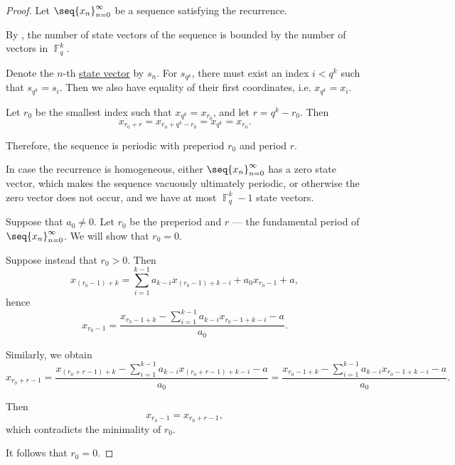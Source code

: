 \begin{proof}
  Let \( \seq{ x_n }_{n=0}^\infty \) be a sequence satisfying the recurrence.

   By , the number of state vectors of the sequence is bounded by the number of vectors in \( \BbbF_q^k \).

  Denote the \( n \)-th \hyperref[def:recurrence_relation/state]{state vector} by \( s_n \). For \( s_{q^k} \), there must exist an index \( i < q^k \) such that \( s_{q^k} = s_i \). Then we also have equality of their first coordinates, i.e. \( x_{q^k} = x_i \).

  Let \( r_0 \) be the smallest index such that \( x_{q^k} = x_{r_0} \), and let \( r = q^k - r_0 \). Then
  \begin{equation*}
    x_{r_0 + r} = x_{r_0 + q^k - r_0} = x_{q^k} = x_{r_0}.
  \end{equation*}

  Therefore, the sequence is periodic with preperiod \( r_0 \) and period \( r \).

   In case the recurrence is homogeneous, either \( \seq{ x_n }_{n=0}^\infty \) has a zero state vector, which makes the sequence vacuously ultimately periodic, or otherwise the zero vector does not occur, and we have at most \( \BbbF_q^k - 1 \) state vectors.

   Suppose that \( a_0 \neq 0 \). Let \( r_0 \) be the preperiod and \( r \) --- the fundamental period of \( \seq{ x_n }_{n=0}^\infty \). We will show that \( r_0 = 0 \).

  Suppose instead that \( r_0 > 0 \). Then
  \begin{equation*}
    x_{(r_0-1)+k} = \sum_{i=1}^{k-1} a_{k-i} x_{(r_0-1)+k-i} + a_0 x_{r_0-1} + a,
  \end{equation*}
  hence
  \begin{equation*}
    x_{r_0-1}
    =
    \frac {x_{r_0-1+k} - \sum_{i=1}^{k-1} a_{k-i} x_{r_0-1+k-i} - a} {a_0}.
  \end{equation*}

  Similarly, we obtain
  \begin{equation*}
    x_{r_0+r-1}
    =
    \frac {x_{(r_0+r-1)+k} - \sum_{i=1}^{k-1} a_{k-i} x_{(r_0+r-1)+k-i} - a} {a_0}
    =
    \frac {x_{r_0-1+k} - \sum_{i=1}^{k-1} a_{k-i} x_{r_0-1+k-i} - a} {a_0}.
  \end{equation*}

  Then
  \begin{equation*}
    x_{r_0-1} = x_{r_0+r-1},
  \end{equation*}
  which contradicts the minimality of \( r_0 \).

  It follows that \( r_0 = 0 \).
\end{proof}

